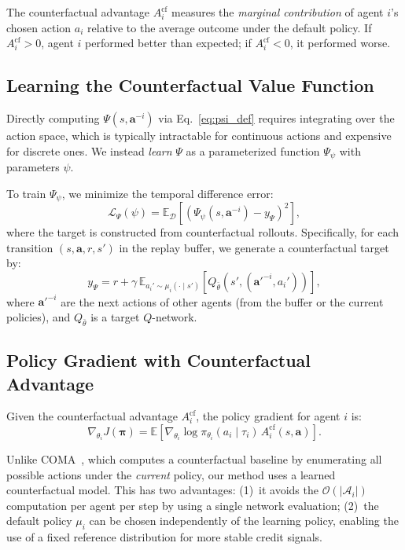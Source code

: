 \documentclass[journal]{IEEEtran}
\newcommand{\EE}{\mathbb{E}}
\begin{document}
The counterfactual advantage $A_i^{\text{cf}}$ measures the \emph{marginal contribution} of agent $i$'s chosen action $a_i$ relative to the average outcome under the default policy. If $A_i^{\text{cf}} > 0$, agent $i$ performed better than expected; if $A_i^{\text{cf}} < 0$, it performed worse.

\subsection{Learning the Counterfactual Value Function}

Directly computing $\Psi(s, \mathbf{a}^{-i})$ via Eq.~\eqref{eq:psi_def} requires integrating over the action space, which is typically intractable for continuous actions and expensive for discrete ones. We instead \emph{learn} $\Psi$ as a parameterized function $\Psi_\psi$ with parameters $\psi$.

To train $\Psi_\psi$, we minimize the temporal difference error:
\begin{equation}
    \mathcal{L}_{\Psi}(\psi) = \EE_{\mathcal{D}}\left[\left(\Psi_\psi(s, \mathbf{a}^{-i}) - y_\Psi\right)^2\right],
    \label{eq:psi_loss}
\end{equation}
where the target is constructed from counterfactual rollouts. Specifically, for each transition $(s, \mathbf{a}, r, s')$ in the replay buffer, we generate a counterfactual target by:
\begin{equation}
    y_\Psi = r + \gamma \, \EE_{a_i' \sim \mu_i(\cdot \mid s')}\left[Q_{\bar{\theta}}(s', (\mathbf{a}'^{-i}, a_i'))\right],
    \label{eq:psi_target}
\end{equation}
where $\mathbf{a}'^{-i}$ are the next actions of other agents (from the buffer or the current policies), and $Q_{\bar{\theta}}$ is a target $Q$-network.

\subsection{Policy Gradient with Counterfactual Advantage}

Given the counterfactual advantage $A_i^{\text{cf}}$, the policy gradient for agent $i$ is:
\begin{equation}
    \nabla_{\theta_i} J(\bm{\pi}) = \EE\left[\nabla_{\theta_i} \log \pi_{\theta_i}(a_i \mid \tau_i) \, A_i^{\text{cf}}(s, \mathbf{a})\right].
    \label{eq:pg}
\end{equation}

Unlike COMA~\cite{foerster2018counterfactual}, which computes a counterfactual baseline by enumerating all possible actions under the \emph{current} policy, our method uses a learned counterfactual model. This has two advantages: (1)~it avoids the $\mathcal{O}(|\mathcal{A}_i|)$ computation per agent per step by using a single network evaluation; (2)~the default policy $\mu_i$ can be chosen independently of the learning policy, enabling the use of a fixed reference distribution for more stable credit signals.
\end{document}
